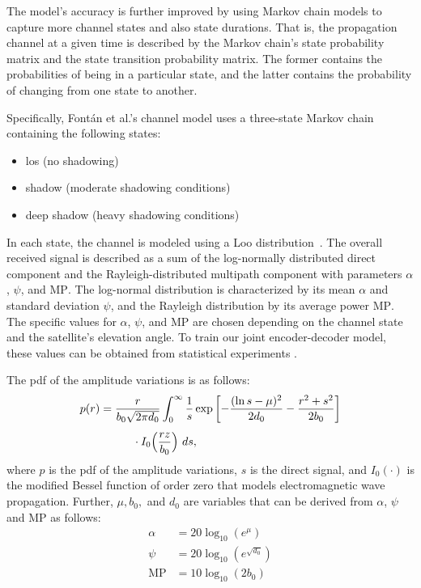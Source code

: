 \documentclass[conference]{IEEEtran}
\newcommand\MP{\ensuremath{\mathrm{MP}}\xspace}
\begin{document}
The model's accuracy is further improved by using Markov chain models to capture more channel states and also state durations.
That is, the propagation channel at a given time is described by the Markov chain's state probability matrix and the state transition probability matrix.
The former contains the probabilities of being in a particular state, and the latter contains the probability of changing from one state to another.

Specifically, Fontán et al.'s channel model \cite{966585} uses a three-state Markov chain containing the following states:
%
\begin{itemize}
  \item \ac{los} (no shadowing)
  \item shadow (moderate shadowing conditions)
  \item deep shadow (heavy shadowing conditions)
\end{itemize}
%
In each state, the channel is modeled using a Loo distribution~\cite{1623307}. 
The overall received signal is described as a sum of the log-normally distributed direct component and the Rayleigh-distributed multipath component with parameters $\alpha$, $\psi$, and \MP.
The log-normal distribution is characterized by its mean $\alpha$ and standard deviation $\psi$, and the Rayleigh distribution by its average power \MP.
The specific values for $\alpha$, $\psi$, and \MP are chosen depending on the channel state and the satellite's elevation angle.
To train our joint encoder-decoder model, these values can be obtained from statistical experiments \cite{channel-params}.

The \ac{pdf} of the amplitude variations is as follows:
\begin{align}
  p(r) &= \frac{r}{b_0\sqrt{2\pi d_0}} \nonumber
  \int_{0}^{\infty}\frac{1}{s} \exp\left[-\frac{(\ln s - \mu)^2}{2d_0} - \frac{r^2 + s^2}{2b_0}\right] \\[1ex]
  &\hphantom{=\int_{0}^{\infty}} \cdot I_0\Big(\frac{rz}{b_0}\Big)\ ds,
\end{align}
%
where $p$ is the \ac{pdf} of the amplitude variations, $s$ is the direct signal, and $I_0(\cdot)$ is the modified Bessel function of order zero that models electromagnetic wave propagation.
Further, $\mu, b_0,$ and $d_0$ are variables that can be derived from $\alpha$, $\psi$ and \MP as follows:
%
\begin{align}
\alpha &= 20\log_{10}(e^\mu) \\
  \psi &= 20\log_{10}(e^{\sqrt{d_0}}) \\
   \MP &= 10\log_{10}(2b_0)
\end{align}
\end{document}

